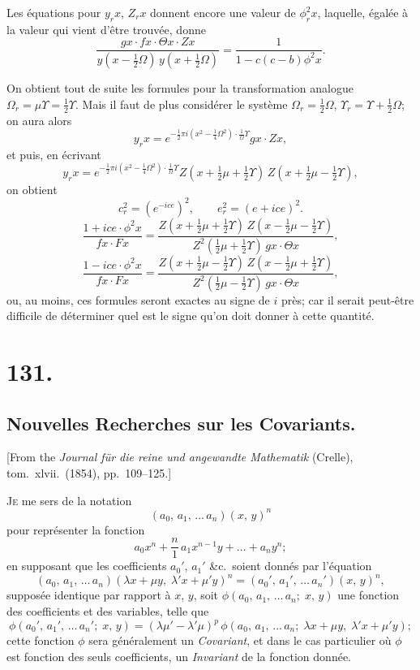 \documentclass[11pt,a4paper]{article}
\theoremstyle{definition}
\begin{document}
Les \'equations pour $y_r x$, $Z_r x$ donnent encore une valeur de
$\phi_r^2 x$, laquelle, \'egal\'ee \`a la valeur qui vient d'\^etre trouv\'ee,
donne
\[
\frac{gx \cdot fx \cdot \Theta x \cdot Zx}{y(x-\tfrac{1}{2}\Omega)\,y(x+\tfrac{1}{2}\Omega)}
= \frac{1}{1-c(c-b)\phi^2 x}.
\]

On obtient tout de suite les formules pour la transformation analogue
$\Omega_r = \mu\Upsilon = \tfrac{1}{2}\Upsilon$. Mais il faut de plus consid\'erer
le syst\`eme $\Omega_r = \tfrac{1}{2}\Omega$, $\Upsilon_r = \Upsilon + \tfrac{1}{2}\Omega$;
on aura alors
\[
y_r x = e^{-\frac{1}{2}\pi i(x^2 - \tfrac{1}{4}\Omega^2)\cdot\tfrac{1}{\Omega}\Upsilon}
gx\cdot Zx,
\]
et puis, en \'ecrivant
\[
y_r x = e^{-\frac{1}{2}\pi i(x^2 - \tfrac{1}{4}\Omega^2)\cdot\tfrac{1}{\Omega}\Upsilon}
Z(x+\tfrac{1}{2}\mu+\tfrac{1}{2}\Upsilon)\,Z(x+\tfrac{1}{2}\mu-\tfrac{1}{2}\Upsilon),
\]
on obtient
\[
c_r^2 = (e^{-ice})^2,\qquad e_r^2 = (e+ice)^2.
\]
\[
\frac{1+ice\cdot\phi^2 x}{fx \cdot Fx}
= \frac{Z(x+\tfrac{1}{2}\mu+\tfrac{1}{2}\Upsilon)\,Z(x-\tfrac{1}{2}\mu-\tfrac{1}{2}\Upsilon)}
{Z^2(\tfrac{1}{2}\mu+\tfrac{1}{2}\Upsilon)\,gx\cdot\Theta x},
\]
\[
\frac{1-ice\cdot\phi^2 x}{fx \cdot Fx}
= \frac{Z(x+\tfrac{1}{2}\mu-\tfrac{1}{2}\Upsilon)\,Z(x-\tfrac{1}{2}\mu+\tfrac{1}{2}\Upsilon)}
{Z^2(\tfrac{1}{2}\mu-\tfrac{1}{2}\Upsilon)\,gx\cdot\Theta x},
\]
ou, au moins, ces formules seront exactes au signe de $i$ pr\`es; car il
serait peut-\^etre difficile de d\'eterminer quel est le signe qu'on doit
donner \`a cette quantit\'e.

\newpage
\section*{131.}
\subsection*{Nouvelles Recherches sur les Covariants.}

[From the \textit{Journal f\"ur die reine und angewandte Mathematik} (Crelle),
tom.\ xlvii.\ (1854), pp.\ 109--125.]

\medskip

\textsc{Je} me sers de la notation
\[
(a_0,\, a_1,\, \ldots\, a_n)(x,\, y)^n
\]
pour repr\'esenter la fonction
\[
a_0 x^n + \frac{n}{1}\,a_1 x^{n-1}y + \ldots + a_n y^n;
\]
en supposant que les coefficients $a_0'$, $a_1'$ \&c.\ soient donn\'es par
l'\'equation
\[
(a_0,\, a_1,\, \ldots\, a_n)(\lambda x + \mu y,\; \lambda' x + \mu' y)^n
= (a_0',\, a_1',\, \ldots\, a_n')(x,\, y)^n,
\]
suppos\'ee identique par rapport \`a $x$, $y$, soit
$\phi(a_0,\, a_1,\, \ldots\, a_n;\; x,\, y)$ une fonction des coefficients et
des variables, telle que
\[
\phi(a_0',\, a_1',\, \ldots\, a_n';\; x,\, y)
= (\lambda\mu' - \lambda'\mu)^p\,
\phi(a_0,\, a_1,\, \ldots\, a_n;\; \lambda x + \mu y,\; \lambda' x + \mu' y);
\]
cette fonction $\phi$ sera g\'en\'eralement un \textit{Covariant}, et dans le
cas particulier o\`u $\phi$ est fonction des seuls coefficients, un
\textit{Invariant} de la fonction donn\'ee.
\end{document}
